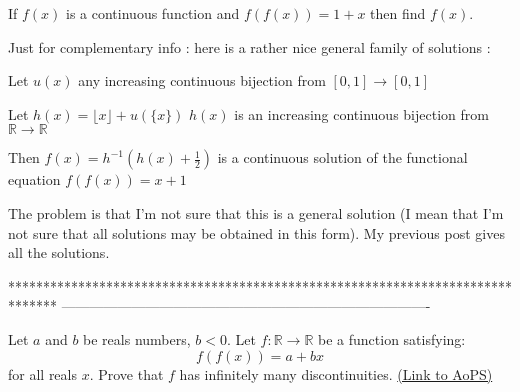 \begin{solution}
	\begin{tcolorbox}If $ f(x) $ is a continuous function and $ f(f(x)) = 1 + x $  then find $ f(x) $.\end{tcolorbox}
Just for complementary info : here is a rather nice general family of solutions :

Let $u(x)$ any increasing continuous bijection from $[0,1]\to[0,1]$

Let $h(x)=\lfloor x\rfloor+u(\{x\})$
$h(x)$ is an increasing continuous bijection from $\mathbb R\to\mathbb R$

Then $f(x)=h^{-1}(h(x)+\frac 12)$ is a continuous solution of the functional equation $f(f(x))=x+1$

The problem is that I'm not sure that this is a general solution (I mean that I'm not sure that all solutions may be obtained in this form).
My previous post gives all the solutions.
\end{solution}
*******************************************************************************
-------------------------------------------------------------------------------

\begin{problem}
	Let $a$ and $b$ be reals numbers, $b<0$. Let $f: \mathbb R \to \mathbb R$ be a function satisfying: 
\[f(f(x))=a+bx\]
for all reals $x$. Prove that $f$ has infinitely many discontinuities.
	\flushright \href{https://artofproblemsolving.com/community/c6h416090}{(Link to AoPS)}
\end{problem}



